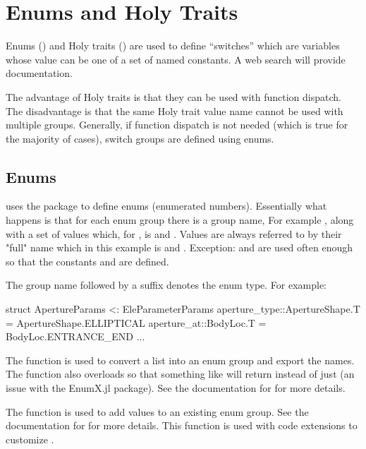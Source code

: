 \chapter{Enums and Holy Traits}
\label{c:enums}

Enums () and Holy traits () are used to define ``switches'' which are
variables whose value can be one of a set of named constants. 
A web search will provide documentation. 

The advantage of Holy traits is that they can be used with function dispatch. The disadvantage is
that the same Holy trait value name cannot be used with multiple groups. Generally, if function
dispatch is not needed (which is true for the majority of cases), switch groups are defined using enums.

\section{Enums}
\label{s:enums}

\accellat uses the package  to define enums (enumerated numbers).
Essentially what happens is that for each enum group there is a group name, For example ,
along with a set of values which, for , is  and . Values
are always referred to by their "full" name which in this example is  and
. Exception:  and  are
used often enough so that the constants  and  are defined.

The group name followed by a  suffix denotes the enum type.
For example:
\begin{example}
  struct ApertureParams <: EleParameterParams
    aperture_type::ApertureShape.T = ApertureShape.ELLIPTICAL
    aperture_at::BodyLoc.T = BodyLoc.ENTRANCE_END
    ...
\end{example}

The  function is used to convert a list into an enum group and export the names.
The  function also overloads  so that something like  
will return  instead of just  (an issue with the EnumX.jl package). 
See the documentation for  for more details.

The  function is used to add values to an existing enum group. See the documentation for
 for more details. This function is used with code extensions to customize \accellat.

